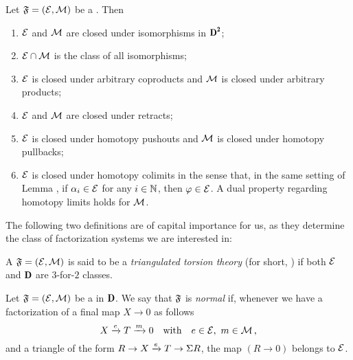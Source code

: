 \begin{proposition}\label{closure_phfs}
Let $\mathfrak{F}=(\mathcal{E},\mathcal{M})$ be a \phfs. Then
\begin{enumerate}
\item $\mathcal{E}$ and $\mathcal{M}$ are closed under isomorphisms in $\cD^\due $;
\item $\mathcal{E}\cap \mathcal{M}$ is the class of all isomorphisms;
\item $\mathcal{E}$ is closed under arbitrary coproducts and $\mathcal{M}$ is closed under arbitrary products;
\item $\mathcal{E}$ and $\mathcal{M}$ are closed under retracts;
\item $\mathcal{E}$ is closed under homotopy pushouts and $\mathcal{M}$ is closed under homotopy pullbacks;
\item $\mathcal{E}$ is closed under homotopy colimits in the sense that, in the same setting of Lemma , if $\alpha_i\in \mathcal{E}$ for any $i\in \mathbb{N}$, then $\varphi\in \mathcal{E}$. A dual property regarding homotopy limits holds for $\mathcal{M}$.
\end{enumerate}
\end{proposition}
The following two definitions are of capital importance for us, as they determine the class of factorization systems we are interested in:
\begin{definition}\label{hott}
A \hfs $\mathfrak{F}=(\mathcal{E},\mathcal{M})$ is said to be a \emph{triangulated torsion theory} (for short, \htth%
) if both $\mathcal{E}$ and $\cD$ are $3$-for-$2$ classes.
\end{definition}
\begin{definition}\label{hontt}
Let $\mathfrak{F}=(\mathcal{E},\mathcal{M})$ be a \hfs in $\cD$. We say that $\mathfrak{F}$ is \emph{normal} if, whenever we have a factorization of a final map $X\to 0$ as follows
\[
X \xrightarrow{e} T \xrightarrow{m}  0\ \ \text{ with }\ \ e\in \mathcal{E},\ m\in \mathcal{M}\,,
\] and a triangle of the form $R\to X \xrightarrow{e} T\to \Sigma R$, the map $(R\to 0)$ belongs to $\mathcal{E}$.
\end{definition}
